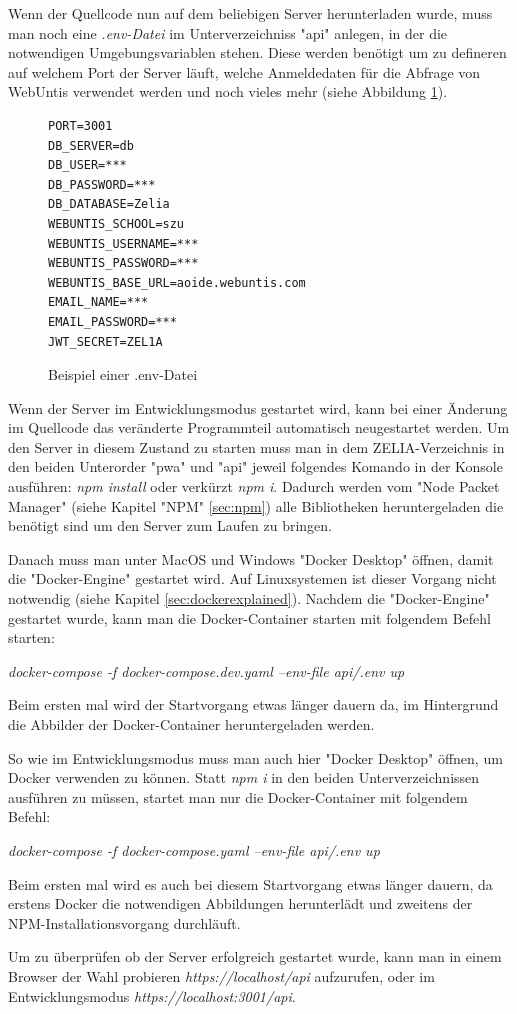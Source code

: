 
Wenn der Quellcode nun auf dem beliebigen Server herunterladen wurde, muss man noch eine \emph{.env-Datei} im Unterverzeichniss "api" anlegen, in der die notwendigen Umgebungsvariablen stehen. Diese werden benötigt um zu defineren auf welchem Port der Server läuft, welche Anmeldedaten für die Abfrage von WebUntis verwendet werden und noch vieles mehr (siehe Abbildung \ref{fig:envexample}).

\begin{figure}[H]
    \begin{lstlisting}
PORT=3001
DB_SERVER=db
DB_USER=***
DB_PASSWORD=***
DB_DATABASE=Zelia
WEBUNTIS_SCHOOL=szu
WEBUNTIS_USERNAME=***
WEBUNTIS_PASSWORD=***
WEBUNTIS_BASE_URL=aoide.webuntis.com
EMAIL_NAME=***
EMAIL_PASSWORD=***
JWT_SECRET=ZEL1A
    \end{lstlisting}
    \caption{Beispiel einer .env-Datei}
   \label{fig:envexample}
\end{figure}


Wenn der Server im Entwicklungsmodus gestartet wird, kann bei einer Änderung im Quellcode das veränderte Programmteil automatisch neugestartet werden. Um den Server in diesem Zustand zu starten muss man in dem ZELIA-Verzeichnis in den beiden Unterorder "pwa" und "api" jeweil folgendes Komando in der Konsole ausführen: \emph{npm install} oder verkürzt \emph{npm i}. Dadurch werden vom "Node Packet Manager" (siehe Kapitel "NPM" \ref{sec:npm}) alle Bibliotheken heruntergeladen die benötigt sind um den Server zum Laufen zu bringen.

Danach muss man unter MacOS und Windows "Docker Desktop" öffnen, damit die "Docker-Engine" gestartet wird. Auf Linuxsystemen ist dieser Vorgang nicht notwendig (siehe Kapitel \ref{sec:dockerexplained}). Nachdem die "Docker-Engine" gestartet wurde, kann man die Docker-Container starten mit folgendem Befehl starten:

\emph{docker-compose -f docker-compose.dev.yaml --env-file api/.env up}  

Beim ersten mal wird der Startvorgang etwas länger dauern da, im Hintergrund die Abbilder der Docker-Container heruntergeladen werden.


So wie im Entwicklungsmodus muss man auch hier "Docker Desktop" öffnen, um Docker verwenden zu können. Statt \emph{npm i} in den beiden Unterverzeichnissen ausführen zu müssen, startet man nur die Docker-Container mit folgendem Befehl:

\emph{docker-compose -f docker-compose.yaml --env-file api/.env up}

Beim ersten mal wird es auch bei diesem Startvorgang etwas länger dauern, da erstens Docker die notwendigen Abbildungen herunterlädt und zweitens der NPM-Installationsvorgang durchläuft.

Um zu überprüfen ob der Server erfolgreich gestartet wurde, kann man in einem Browser der Wahl probieren \emph{https://localhost/api} aufzurufen, oder im Entwicklungsmodus \emph{https://localhost:3001/api}.
